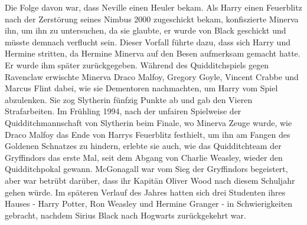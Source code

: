 \documentclass[a4paper, 10pt]{article}
\begin{document}
Die Folge davon war, dass Neville einen Heuler bekam. Als Harry einen Feuerblitz nach der Zerstörung seines Nimbus 2000 zugeschickt bekam, konfiszierte Minerva ihn, um ihn zu untersuchen, da sie glaubte, er wurde von Black geschickt und müsste demnach verflucht sein. Dieser Vorfall führte dazu, dass sich Harry und Hermine stritten, da Hermine Minerva auf den Besen aufmerksam gemacht hatte. Er wurde ihm später zurückgegeben. Während des Quidditchspiels gegen Ravenclaw erwischte Minerva Draco Malfoy, Gregory Goyle, Vincent Crabbe und Marcus Flint dabei, wie sie Dementoren nachmachten, um Harry vom Spiel abzulenken. Sie zog Slytherin fünfzig Punkte ab und gab den Vieren Strafarbeiten. Im Frühling 1994, nach der unfairen Spielweise der Quidditchmannschaft von Slytherin beim Finale, wo Minerva Zeuge wurde, wie Draco Malfoy das Ende von Harrys Feuerblitz festhielt, um ihn am Fangen des Goldenen Schnatzes zu hindern, erlebte sie auch, wie das Quidditchteam der Gryffindors das erste Mal, seit dem Abgang von Charlie Weasley, wieder den Quidditchpokal gewann. McGonagall war vom Sieg der Gryffindors begeistert, aber war betrübt darüber, dass ihr Kapitän Oliver Wood nach diesem Schuljahr gehen würde. Im späteren Verlauf des Jahres hatten sich drei Studenten ihres Hauses - Harry Potter, Ron Weasley und Hermine Granger - in Schwierigkeiten gebracht, nachdem Sirius Black nach Hogwarts zurückgekehrt war.
\end{document}
